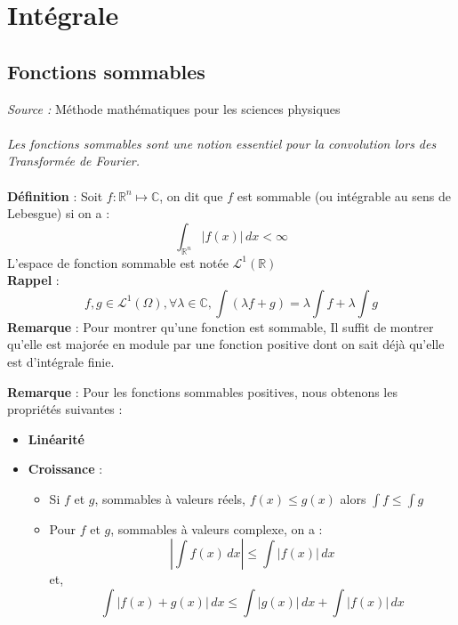 \documentclass[a4paper]{book}
\begin{document}
\chapter{Intégrale}
\section{Fonctions sommables}
\emph{Source :} Méthode mathématiques pour les sciences physiques\\
\\
\emph{Les fonctions sommables sont une notion essentiel pour la convolution lors des
Transformée de Fourier.}
\\
\\
\textbf{Définition} : Soit $f : \mathbb{R}^{n} \mapsto \mathbb{C}$, on dit que
$f$ est sommable (ou  intégrable au sens de Lebesgue) si on a :
\begin{equation}
	\int_{\mathbb{R}^{n}} | f(x) | \, dx < \infty
\end{equation}
L'espace de fonction sommable est notée $\mathcal{L}^{1}(\mathbb{R})$\\
\textbf{Rappel} : 
\begin{equation}
	f,g \in \mathcal{L}^{1}(\Omega), \forall \lambda \in \mathbb{C}, \int
	(\lambda f + g) = \lambda \int f + \lambda \int g
\end{equation}
\textbf{Remarque} : Pour montrer qu'une fonction est sommable, 
Il suffit de montrer qu'elle est majorée en module par une
fonction positive dont on sait déjà qu'elle est d'intégrale finie.

\textbf{Remarque} : Pour les fonctions sommables positives, nous obtenons les
propriétés suivantes :
\begin{itemize}
	\item \textbf{Linéarité}
	\item \textbf{Croissance} : 
		\begin{itemize}
			\item Si $f$ et $g$, sommables à valeurs réels, $f(x)
				\leq g(x)$ alors $\int f \leq \int g$
			\item Pour $f$ et $g$, sommables à valeurs complexe, on
				a : 
				\begin{equation}
					| \int f(x) \,dx | \leq \int |f(x)|\,dx
				\end{equation}
				et,
				\begin{equation}
					\int |f(x)+g(x)| \,dx \leq  
						\int |g(x)|\,dx + \int |f(x)|\,dx
				\end{equation}


		\end{itemize}
\end{itemize}
\end{document}

